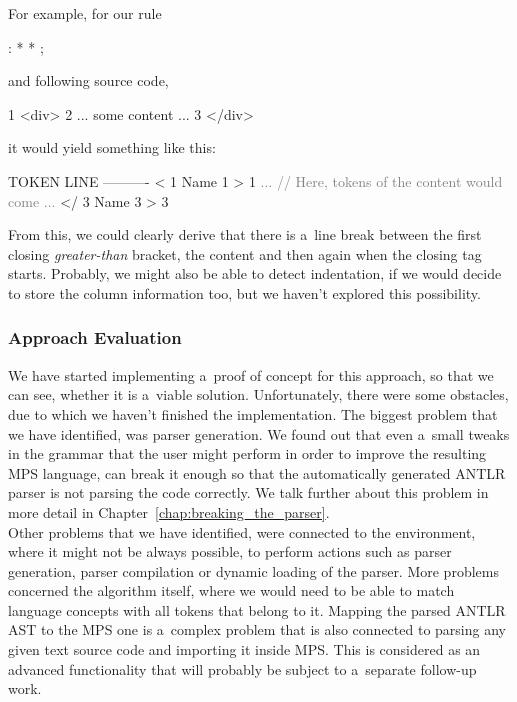 \noindent
For example, for our  rule

\begin{antlr}
	  :   \literal{<}  * \literal{>} * \literal{</}  \literal{>} ;
\end{antlr}

\noindent
and following source code,

\begin{antlr}
	1   <div>
	2      ... some content ...
	3   </div>
\end{antlr}

\noindent
it would yield something like this:

\begin{antlr}
	TOKEN LINE
	----------
	<       1
	Name    1
	>       1
	\textcolor{gray}{...}
	\textcolor{gray}{// Here, tokens of the content would come}
	\textcolor{gray}{...}
	</      3
	Name    3
	>       3
\end{antlr}

From this, we could clearly derive that there is a~line break between the first closing \textit{greater-than} bracket, the content and then again when the closing tag starts.
Probably, we might also be able to detect indentation, if we would decide to store the column information too, but we haven't explored this possibility.

\subsubsection{Approach Evaluation}

We have started implementing a~proof of concept for this approach, so that we can see, whether it is a~viable solution.
Unfortunately, there were some obstacles, due to which we haven't finished the implementation.
The biggest problem that we have identified, was parser generation.
We found out that even a~small tweaks in the grammar that the user might perform in order to improve the resulting MPS language, can break it enough so that the automatically generated ANTLR parser is not parsing the code correctly.
We talk further about this problem in more detail in Chapter~\ref{chap:breaking_the_parser}.
\\

Other problems that we have identified, were connected to the environment, where it might not be always possible, to perform actions such as parser generation, parser compilation or dynamic loading of the parser.
More problems concerned the algorithm itself, where we would need to be able to match language concepts with all tokens that belong to it.
Mapping the parsed ANTLR AST to the MPS one is a~complex problem that is also connected to parsing any given text source code and importing it inside MPS.
This is considered as an advanced functionality that will probably be subject to a~separate follow-up work.
\\

